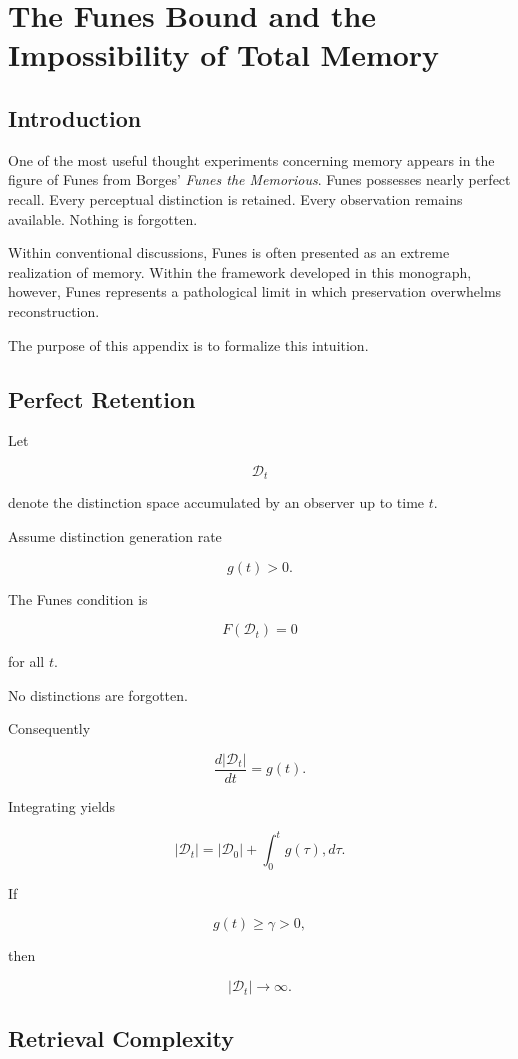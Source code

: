 \documentclass[12pt,oneside]{book}
\theoremstyle{plain} \newtheorem{theorem}{Theorem}[chapter] \newtheorem{lemma}[theorem]{Lemma} \newtheorem{proposition}[theorem]{Proposition} \newtheorem{corollary}[theorem]{Corollary}
\theoremstyle{definition} \newtheorem{definition}[theorem]{Definition} \newtheorem{axiom}[theorem]{Axiom} \newtheorem{construction}[theorem]{Construction}
\theoremstyle{remark} \newtheorem{remark}[theorem]{Remark} \newtheorem{example}[theorem]{Example}
\newcommand{\D}{\mathcal{D}} \newcommand{\R}{\mathcal{R}} \newcommand{\F}{\mathcal{F}} \newcommand{\U}{\mathcal{U}} \newcommand{\M}{\mathcal{M}} \newcommand{\G}{\Gamma}
\begin{document}
\appendix

\chapter{The Funes Bound and the Impossibility of Total Memory}

\section{Introduction}

One of the most useful thought experiments concerning memory appears in the figure of Funes from Borges' \emph{Funes the Memorious}. Funes possesses nearly perfect recall. Every perceptual distinction is retained. Every observation remains available. Nothing is forgotten.

Within conventional discussions, Funes is often presented as an extreme realization of memory. Within the framework developed in this monograph, however, Funes represents a pathological limit in which preservation overwhelms reconstruction.

The purpose of this appendix is to formalize this intuition.

\section{Perfect Retention}

Let

\[
\D_t
\]

denote the distinction space accumulated by an observer up to time $t$.

Assume distinction generation rate

\[
g(t)>0.
\]

The Funes condition is

\[
F(\D_t)=0
\]

for all $t$.

No distinctions are forgotten.

Consequently

\[
\frac{d|\D_t|}{dt}
=
g(t).
\]

Integrating yields

\[
|\D_t|
=
|\D_0|
+
\int_0^t g(\tau),d\tau.
\]

If

\[
g(t)\geq \gamma>0,
\]

then

\[
|\D_t|
\rightarrow
\infty.
\]

\section{Retrieval Complexity}
\end{document}
